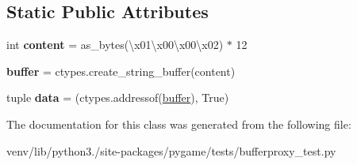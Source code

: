 \subsection*{Static Public Attributes}
\begin{DoxyCompactItemize}
\item 
\mbox{\label{classpygame_1_1tests_1_1bufferproxy__test_1_1_buffer_proxy_legacy_test_aaaf2a2bf93a10ff42bd85840455e1f75}} 
int {\bfseries content} = as\+\_\+bytes(\textquotesingle{}\textbackslash{}x01\textbackslash{}x00\textbackslash{}x00\textbackslash{}x02\textquotesingle{}) $\ast$ 12
\item 
\mbox{\label{classpygame_1_1tests_1_1bufferproxy__test_1_1_buffer_proxy_legacy_test_a184f86787072e479842636b78421dbe1}} 
{\bfseries buffer} = ctypes.\+create\+\_\+string\+\_\+buffer(content)
\item 
\mbox{\label{classpygame_1_1tests_1_1bufferproxy__test_1_1_buffer_proxy_legacy_test_aac5c71801907593aab7efb254ad388c3}} 
tuple {\bfseries data} = (ctypes.\+addressof(\hyperlink{structbuffer}{buffer}), True)
\end{DoxyCompactItemize}


The documentation for this class was generated from the following file\+:\begin{DoxyCompactItemize}
\item 
venv/lib/python3./site-\/packages/pygame/tests/bufferproxy\+\_\+test.\+py\end{DoxyCompactItemize}
